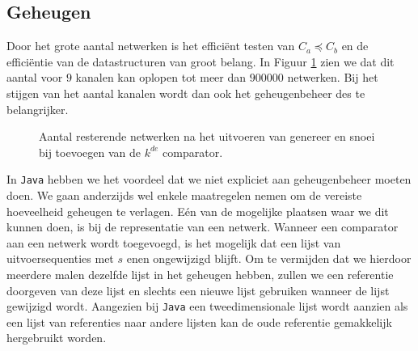 \documentclass{article}
\begin{document}
\subsection{Geheugen}\label{Geheugen}
Door het grote aantal netwerken is het effici\"ent testen van ${C_a \preceq C_b}$ en de effici\"entie van de datastructuren van groot belang. In Figuur \ref{netwerkVerloop9kanalen} zien we dat dit aantal voor $9$ kanalen kan oplopen tot meer dan $900000$ netwerken. Bij het stijgen van het aantal kanalen wordt dan ook het geheugenbeheer des te belangrijker.
\begin{figure}[!h]
	\centering
	\caption{Aantal resterende netwerken na het uitvoeren van genereer en snoei bij toevoegen van de $k^{de}$ comparator.}
	\label{netwerkVerloop9kanalen}
\end{figure}

In \texttt{Java} hebben we het voordeel dat we niet expliciet aan geheugenbeheer moeten doen.
We gaan anderzijds wel enkele maatregelen nemen om de vereiste hoeveelheid geheugen te verlagen.
E\'en van de mogelijke plaatsen waar we dit kunnen doen, is bij de representatie van een netwerk.
Wanneer een comparator aan een netwerk wordt toegevoegd, is het mogelijk dat een lijst van uitvoersequenties met $s$ enen ongewijzigd blijft.
Om te vermijden dat we hierdoor meerdere malen dezelfde lijst in het geheugen hebben, zullen we een referentie doorgeven van deze lijst en slechts een nieuwe lijst gebruiken wanneer de lijst gewijzigd wordt.
Aangezien bij \texttt{Java} een tweedimensionale lijst wordt aanzien als een lijst van referenties naar andere lijsten kan de oude referentie gemakkelijk hergebruikt worden. 
\end{document}
